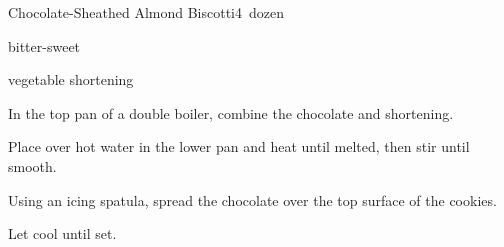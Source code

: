 \begin{recipe}{Chocolate-Sheathed Almond Biscotti}{}{4\half\ dozen}

\begin{ingredients}
\item {} bitter-sweet 
\item \tp{\half} vegetable shortening
\end{ingredients}

\begin{directions}
\item In the top pan of a double boiler, combine the chocolate and shortening.
\item Place over hot water in the lower pan and heat until melted, then stir until smooth.
\item Using an icing spatula, spread the chocolate over the top surface of the cookies.
\item Let cool until set.
\end{directions}

\end{recipe}
